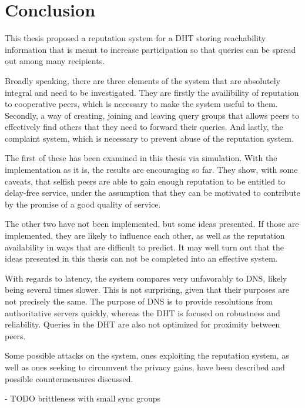 \chapter{Conclusion}
\label{chap:conclusion}
This thesis proposed a reputation system for a DHT storing reachability
information that is meant to increase participation so that queries can be
spread out among many recipients.

Broadly speaking, there are three elements of the system that are absolutely
integral and need to be investigated. They are firstly the availibility of
reputation to cooperative peers, which is necessary to make the system useful to
them. Secondly, a way of creating, joining and leaving query groups that allows
peers to effectively find others that they need to forward their queries. And
lastly, the complaint system, which is necessary to prevent abuse of the
reputation system.

The first of these has been examined in this thesis via simulation. With the
implementation as it is, the results are encouraging so far. They show, with
some caveats, that selfish peers are able to gain enough reputation to be
entitled to delay-free service, under the assumption that they can be motivated
to contribute by the promise of a good quality of service.

The other two have not been implemented, but some ideas presented. If those are
implemented, they are likely to influence each other, as well as the reputation
availability in ways that are difficult to predict. It may well turn out that
the ideas presented in this thesis can not be completed into an effective
system.

With regards to latency, the system compares very unfavorably to DNS, likely
being several times slower. This is not surprising, given that their purposes
are not precisely the same. The purpose of DNS is to provide resolutions from
authoritative servers quickly, whereas the DHT is focused on robustness and
reliability. Queries in the DHT are also not optimized for proximity between
peers.

Some possible attacks on the system, ones exploiting the reputation system, as
well as ones seeking to circumvent the privacy gains, have been described and
possible countermeasures discussed.

- TODO brittleness with small sync groups
